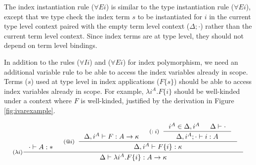 The index instantiation rule ($\forall E i$) is similar to
the type instantiation rule ($\forall E i$), except that
we type check the index term $s$ to be instantiated for $i$
in the current type level context paired with the empty term level context
($\Delta;\cdot$) rather than the current term level context.
Since index terms are at type level, they should not depend on
term level bindings.

In addition to the rules ($\forall I i$) and ($\forall E i$) for
index polymorphism, we need an additional variable rule 
to be able to access the index variables already in scope. Terms ($s$) used
at type level in index applications ($F\{s\}$) should be able to access
index variables already in scope. For example, $\lambda i^A.F\{i\}$ should be
well-kinded under a context where $F$ is well-kinded,
justified by the derivation in Figure \ref{fig:ivarexample}.
\begin{figure*}
\[ \inference[($\lambda i$)]
      { \cdot |- A:* &
	\inference[($@i$)]{ \Delta, i^A |- F : A -> \kappa
                          & \inference[($:i$)]{ i^A\in \Delta,i^A
                                              & \Delta |- \cdot }
                                              {\Delta,i^A;\cdot |- i:A}
                          }
                          {\Delta, i^A |- F\{i\} : \kappa} }
      {\Delta |- \lambda i^A.F\{i\} :A -> \kappa}
\]
\caption{Kinding derivation for an index abstraction}
\label{fig:ivarexample}
\end{figure*}






